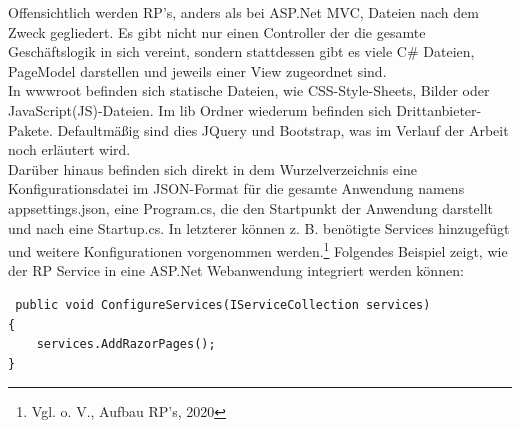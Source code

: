 \documentclass[a4paper,
12pt,
oneside]
{article}
\begin{document}
	Offensichtlich werden RP's, anders als bei ASP.Net MVC, Dateien nach dem Zweck gegliedert. Es gibt nicht nur einen Controller der die gesamte Geschäftslogik in sich vereint, sondern stattdessen gibt es viele C\# Dateien, PageModel darstellen und jeweils einer View zugeordnet sind. \\
	In wwwroot befinden sich statische Dateien, wie CSS-Style-Sheets, Bilder oder JavaScript(JS)-Dateien. Im lib Ordner wiederum befinden sich Drittanbieter-Pakete. Defaultmäßig sind dies JQuery und Bootstrap, was im Verlauf der Arbeit noch erläutert wird. \\
	Darüber hinaus befinden sich direkt in dem Wurzelverzeichnis eine Konfigurationsdatei im JSON-Format für die gesamte Anwendung namens \glqq appsettings.json\grqq, eine \glqq Program.cs\grqq, die den Startpunkt der Anwendung darstellt und nach eine \glqq Startup.cs\grqq. In letzterer können z. B. benötigte Services hinzugefügt und weitere Konfigurationen vorgenommen werden.\footnote{Vgl. o. V., Aufbau RP's, 2020} Folgendes Beispiel zeigt, wie der RP Service in eine ASP.Net Webanwendung integriert werden können:
	\lstset{style=csharp}
	\begin{lstlisting}
 public void ConfigureServices(IServiceCollection services)
{
	services.AddRazorPages();
}
	\end{lstlisting}
	
\end{document}
